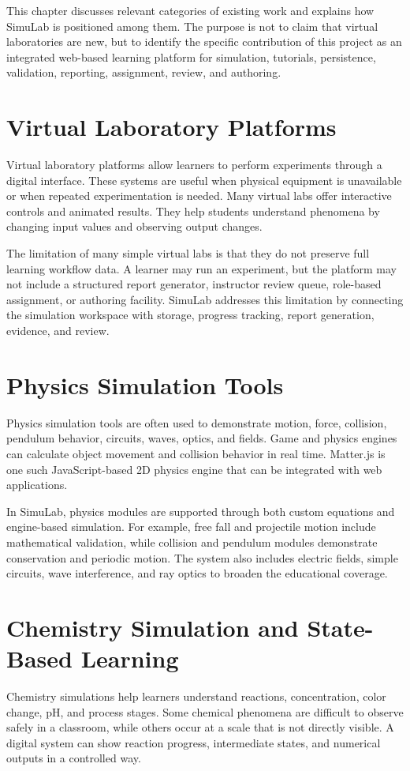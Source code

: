 \documentclass[12pt,a4paper]{report}
\begin{document}
This chapter discusses relevant categories of existing work and explains how SimuLab is positioned among them. The purpose is not to claim that virtual laboratories are new, but to identify the specific contribution of this project as an integrated web-based learning platform for simulation, tutorials, persistence, validation, reporting, assignment, review, and authoring.

\section{Virtual Laboratory Platforms}
Virtual laboratory platforms allow learners to perform experiments through a digital interface. These systems are useful when physical equipment is unavailable or when repeated experimentation is needed. Many virtual labs offer interactive controls and animated results. They help students understand phenomena by changing input values and observing output changes.

The limitation of many simple virtual labs is that they do not preserve full learning workflow data. A learner may run an experiment, but the platform may not include a structured report generator, instructor review queue, role-based assignment, or authoring facility. SimuLab addresses this limitation by connecting the simulation workspace with storage, progress tracking, report generation, evidence, and review.

\section{Physics Simulation Tools}
Physics simulation tools are often used to demonstrate motion, force, collision, pendulum behavior, circuits, waves, optics, and fields. Game and physics engines can calculate object movement and collision behavior in real time. Matter.js is one such JavaScript-based 2D physics engine that can be integrated with web applications.

In SimuLab, physics modules are supported through both custom equations and engine-based simulation. For example, free fall and projectile motion include mathematical validation, while collision and pendulum modules demonstrate conservation and periodic motion. The system also includes electric fields, simple circuits, wave interference, and ray optics to broaden the educational coverage.

\section{Chemistry Simulation and State-Based Learning}
Chemistry simulations help learners understand reactions, concentration, color change, pH, and process stages. Some chemical phenomena are difficult to observe safely in a classroom, while others occur at a scale that is not directly visible. A digital system can show reaction progress, intermediate states, and numerical outputs in a controlled way.
\end{document}
